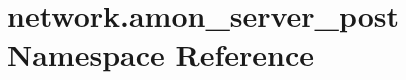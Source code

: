 \hypertarget{namespacenetwork_1_1amon__server__post}{\section{network.\-amon\-\_\-server\-\_\-post Namespace Reference}
\label{namespacenetwork_1_1amon__server__post}
}

